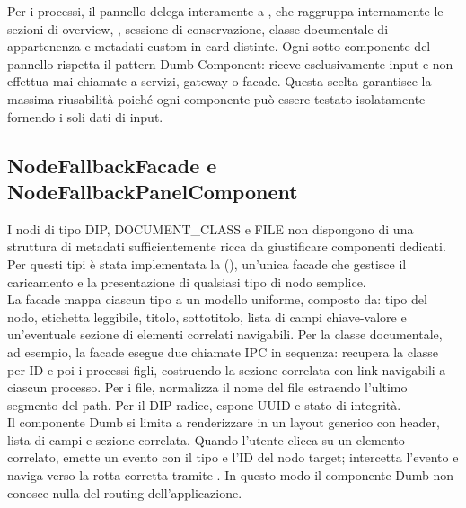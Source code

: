 Per i processi, il pannello delega interamente a , che raggruppa internamente le sezioni di overview, , sessione di conservazione, classe documentale di appartenenza e metadati custom in card distinte.
Ogni sotto-componente del pannello rispetta il pattern Dumb Component: riceve esclusivamente input e non effettua mai chiamate a servizi, gateway o facade. Questa scelta garantisce la massima riusabilità poiché ogni componente può essere testato isolatamente fornendo i soli dati di input.

\subsection{NodeFallbackFacade e NodeFallbackPanelComponent}
I nodi di tipo DIP, DOCUMENT\_CLASS e FILE non dispongono di una struttura di metadati sufficientemente ricca da giustificare componenti dedicati. Per questi tipi è stata implementata la  (), un'unica facade che gestisce il caricamento e la presentazione di qualsiasi tipo di nodo semplice.\\
La facade mappa ciascun tipo a un modello  uniforme, composto da: tipo del nodo, etichetta leggibile, titolo, sottotitolo, lista di campi chiave-valore e un'eventuale sezione di elementi correlati navigabili. Per la classe documentale, ad esempio, la facade esegue due chiamate IPC in sequenza: recupera la classe per ID e poi i processi figli, costruendo la sezione correlata con link navigabili a ciascun processo. Per i file, normalizza il nome del file estraendo l'ultimo segmento del path. Per il DIP radice, espone UUID e stato di integrità.\\
Il componente Dumb  si limita a renderizzare  in un layout generico con header, lista di campi e sezione correlata. Quando l'utente clicca su un elemento correlato, emette un evento con il tipo e l'ID del nodo target;  intercetta l'evento e naviga verso la rotta corretta tramite . In questo modo il componente Dumb non conosce nulla del routing dell'applicazione.

